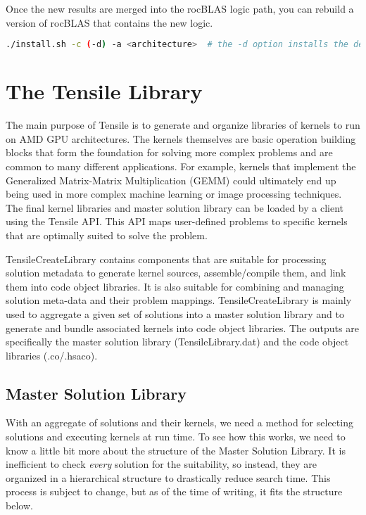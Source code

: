 \documentclass[]{article}
\begin{document}
\noindent
Once the new results are merged into the rocBLAS logic path, you can rebuild a version of rocBLAS that contains the new logic.

\begin{lstlisting}[language=bash]
./install.sh -c (-d) -a <architecture>  # the -d option installs the dependencies, -c build the client apps
\end{lstlisting}

\section{The Tensile Library}
\label{sec:TensileLib}
The main purpose of Tensile is to generate and organize libraries of kernels to run on AMD GPU architectures. The kernels themselves are basic operation building blocks that form the foundation for solving more complex problems and are common to many different applications. For example, kernels that implement the Generalized Matrix-Matrix Multiplication (GEMM) could ultimately end up being used in more complex machine learning or image processing techniques.
The final kernel libraries and master solution library can be loaded by a client using the Tensile API. This API maps user-defined problems to specific kernels that are optimally suited to solve the problem.

TensileCreateLibrary contains components that are suitable for processing solution metadata to generate kernel sources, assemble/compile them, and link them into code object libraries. It is also suitable for combining and managing solution meta-data and their problem mappings. TensileCreateLibrary is mainly used to aggregate a given set of solutions into a master solution library and to generate and bundle associated kernels into code object libraries. The outputs are specifically the master solution library (TensileLibrary.dat) and the code object libraries (.co/.hsaco).

\subsection{Master Solution Library}

With an aggregate of solutions and their kernels, we need a method for selecting solutions and executing kernels at run time. To see how this works, we need to know a little bit more about the structure of the Master Solution Library. It is inefficient to check \textit{every} solution for the suitability, so instead, they are organized in a hierarchical structure to drastically reduce search time. This process is subject to change, but as of the time of writing, it fits the structure below.
\end{document}
